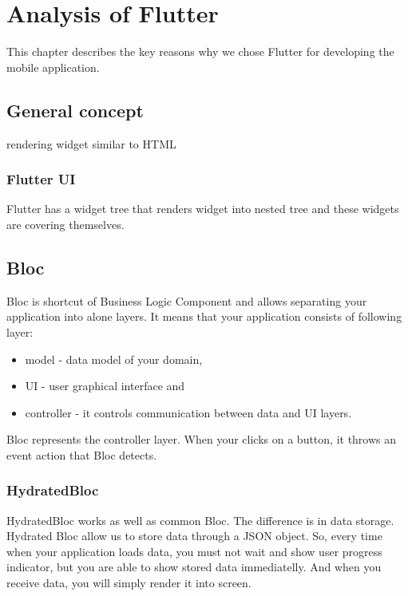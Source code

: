 \chapter{Analysis of Flutter}\label{ch:analysis-of-flutter}

This chapter describes the key reasons why we chose Flutter for developing the mobile application.


\section{General concept}\label{sec:general-concept}
rendering widget similar to HTML

\subsection{Flutter UI}\label{subsec:flutter-ui}
Flutter has a widget tree that renders widget into nested tree and these widgets are covering themselves.

\section{Bloc}\label{sec:bloc}
Bloc is shortcut of Business Logic Component and allows separating your application into alone layers. It means that your application consists of following layer:
\begin{itemize}
    \item model - data model of your domain,
    \item UI - user graphical interface and 
    \item controller - it controls communication between data and UI layers.
\end{itemize}
Bloc represents the controller layer.
When your clicks on a button, it throws an event action that Bloc detects.

\subsection{HydratedBloc}\label{subsec:hydratedbloc}
HydratedBloc works as well as common Bloc.
The difference is in data storage.
Hydrated Bloc allow us to store data through a JSON object.
So, every time when your application loads data, you must not wait and show user progress indicator, but you are able to show stored data immediatelly.
And when you receive data, you will simply render it into screen.

